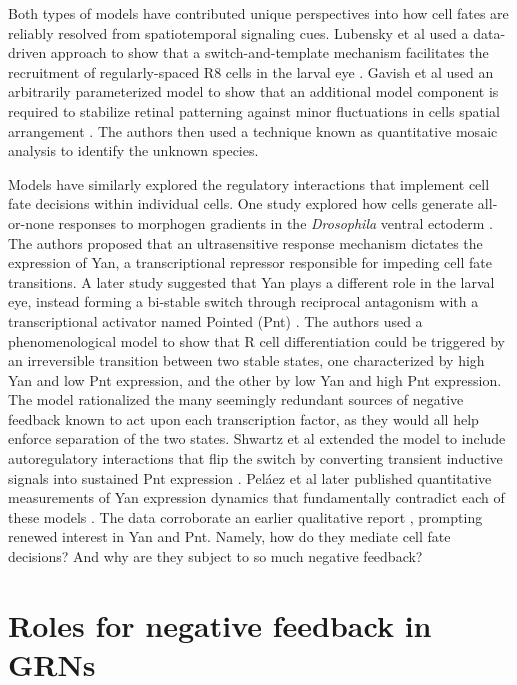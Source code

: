 Both types of models have contributed unique perspectives into how cell fates are reliably resolved from spatiotemporal signaling cues. Lubensky et al used a data-driven approach to show that a switch-and-template mechanism facilitates the recruitment of regularly-spaced R8 cells in the larval eye \cite{Lubensky2011}. Gavish et al used an arbitrarily parameterized model to show that an additional model component is required to stabilize retinal patterning against minor fluctuations in cells spatial arrangement \cite{Gavish2016}. The authors then used a technique known as quantitative mosaic analysis to identify the unknown species.

Models have similarly explored the regulatory interactions that implement cell fate decisions within individual cells. One study explored how cells generate all-or-none responses to morphogen gradients in the \textit{Drosophila} ventral ectoderm \cite{Melen2005}. The authors proposed that an ultrasensitive response mechanism dictates the expression of Yan, a transcriptional repressor responsible for impeding cell fate transitions. A later study suggested that Yan plays a different role in the larval eye, instead forming a bi-stable switch through reciprocal antagonism with a transcriptional activator named Pointed (Pnt) \cite{Graham2010}. The authors used a phenomenological model to show that R cell differentiation could be triggered by an irreversible transition between two stable states, one characterized by high Yan and low Pnt expression, and the other by low Yan and high Pnt expression. The model rationalized the many  seemingly redundant sources of negative feedback known to act upon each transcription factor, as they would all help enforce separation of the two states. Shwartz et al extended the model to include autoregulatory interactions that flip the switch by converting transient inductive signals into sustained Pnt expression \cite{Shwartz2013}. Pel\'{a}ez et al later published quantitative measurements of Yan expression dynamics that fundamentally contradict each of these models \cite{Pelaez2015}. The data corroborate an earlier qualitative report \cite{BoisclairLachance2014}, prompting renewed interest in Yan and Pnt. Namely, how do they mediate cell fate decisions? And why are they subject to so much negative feedback?

\section{Roles for negative feedback in GRNs}
 
